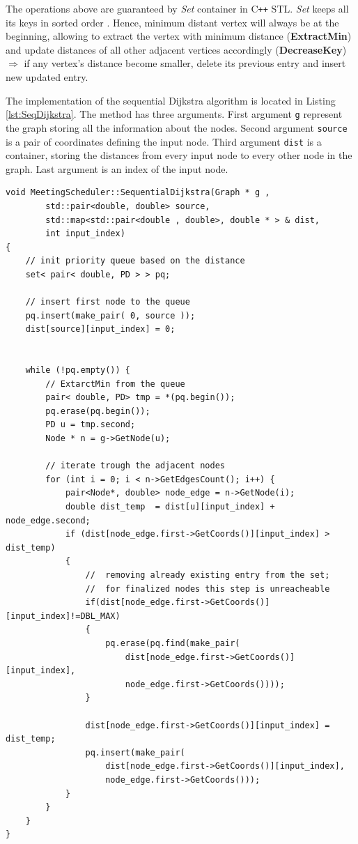 \documentclass[thesis=M,english]{FITthesis}[2012/10/20]
\begin{document}
The operations above are guaranteed by \textit{Set} container in C\texttt{++} STL. \textit{Set} keeps all its keys in sorted order \cite{STL17}. Hence, minimum distant vertex will always be at the beginning, allowing to extract the vertex with minimum distance (\textbf{ExtractMin}) and update distances of all other adjacent vertices accordingly (\textbf{DecreaseKey}) $\Rightarrow$ if any vertex's distance become smaller, delete its previous entry and insert new updated entry.

The implementation of the sequential Dijkstra algorithm is located in Listing \ref{lst:SeqDijkstra}. The method has three arguments. First argument \texttt{g} represent the graph storing all the information about the nodes. Second argument \texttt{source} is a pair of coordinates defining the input node. Third argument \texttt{dist} is a container, storing the distances from every input node to every other node in the graph. Last argument is an index of the input node.

\begin{lstlisting}[frame=single, caption={Sequential Dijkstra algorithm}, label={lst:SeqDijkstra}, breaklines=true]
void MeetingScheduler::SequentialDijkstra(Graph * g , 
		std::pair<double, double> source, 
		std::map<std::pair<double , double>, double * > & dist, 
		int input_index)
{
    // init priority queue based on the distance
    set< pair< double, PD > > pq;

    // insert first node to the queue
    pq.insert(make_pair( 0, source ));
    dist[source][input_index] = 0;


    while (!pq.empty()) {
        // ExtarctMin from the queue
        pair< double, PD> tmp = *(pq.begin());
        pq.erase(pq.begin());
        PD u = tmp.second;
        Node * n = g->GetNode(u);

        // iterate trough the adjacent nodes
        for (int i = 0; i < n->GetEdgesCount(); i++) {
            pair<Node*, double> node_edge = n->GetNode(i);
            double dist_temp  = dist[u][input_index] + node_edge.second;
            if (dist[node_edge.first->GetCoords()][input_index] > dist_temp)
            {
                // 	removing already existing entry from the set; 
                //	for finalized nodes this step is unreacheable
                if(dist[node_edge.first->GetCoords()][input_index]!=DBL_MAX)
                {
                    pq.erase(pq.find(make_pair(
                    	dist[node_edge.first->GetCoords()][input_index], 
                    	node_edge.first->GetCoords())));
                }

                dist[node_edge.first->GetCoords()][input_index] = dist_temp;
                pq.insert(make_pair(
                	dist[node_edge.first->GetCoords()][input_index], 
                	node_edge.first->GetCoords()));
            }
        }
    }
}
\end{lstlisting}
\end{document}

